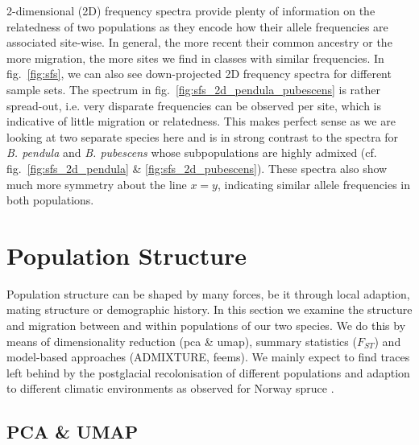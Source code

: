 \documentclass[hidelinks,11pt]{article}
\newcommand{\pendula}{\textit{B. pendula}}
\newcommand{\pubescens}{\textit{B. pubescens}}
\begin{document}
{    2-dimensional (2D) frequency spectra provide plenty of information on the relatedness of two populations as they encode how their allele frequencies are associated site-wise. In general, the more recent their common ancestry or the more migration, the more sites we find in classes with similar frequencies. In fig.~\ref{fig:sfs}, we can also see down-projected 2D frequency spectra for different sample sets. The spectrum in fig.~\ref{fig:sfs_2d_pendula_pubescens} is rather spread-out, i.e. very disparate frequencies can be observed per site, which is indicative of little migration or relatedness. This makes perfect sense as we are looking at two separate species here and is in strong contrast to the spectra for \pendula{} and \pubescens{} whose subpopulations are highly admixed (cf. fig.~\ref{fig:sfs_2d_pendula} \& \ref{fig:sfs_2d_pubescens}). These spectra also show much more symmetry about the line $x=y$, indicating similar allele frequencies in both populations.

    \clearpage

    \section{Population Structure}
    \label{sec:population-structure}

    Population structure can be shaped by many forces, be it through local adaption, mating structure or demographic history. In this section we examine the structure and migration between and within populations of our two species. We do this by means of dimensionality reduction (\acrshort{pca} \& \acrshort{umap}), summary statistics ($F_{ST}$) and model-based approaches (\mbox{ADMIXTURE}, \acrshort{feems}). We mainly expect to find traces left behind by the postglacial recolonisation of different populations and adaption to different climatic environments as observed for Norway spruce \cite{spruce-demography}.

    \subsection{PCA \& UMAP}
    \label{sec:pca-umap}

}
\end{document}
